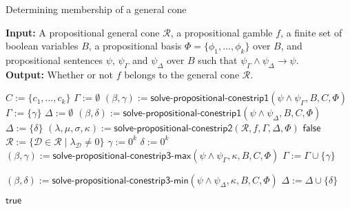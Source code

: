 \documentclass{article}
\theoremstyle{mytheorem}
\newcommand{\func}[1]{\ensuremath{\textsf{#1}}} %
\newcommand{\set}[1]{\ensuremath{\{ #1 \} }} %
\begin{document}
\begin{algorithm}[h]
\caption{Determining membership of a general cone}
{\textbf{Input:}} A propositional general cone $\mathcal{R}$, a propositional gamble $f$, a finite set of boolean variables $B$, a propositional basis $\Phi = \set{\phi_1, \ldots, \phi_k}$ over $B$, and propositional sentences $\psi$, $\psi_\Gamma$ and $\psi_\Delta$ over $B$ such that $\psi_\Gamma \land \psi_\Delta \rightarrow \psi$.
\\
{\textbf{Output:} Whether or not $f$ belongs to the general cone $\mathcal{R}$. }
\label{alg:propositional-conestrip}
\begin{algorithmic}[1]
\State $C := \set{c_1, \ldots, c_k}$ 
\State $\Gamma := \emptyset$
\State $(\beta, \gamma) := \func{solve-propositional-conestrip1}(\psi \land \psi_\Gamma, B, C, \Phi)$
\If {$\gamma \neq \bot$}
  \State $\Gamma := \set{\gamma}$
\EndIf
\State $\Delta := \emptyset$
\State $(\beta, \delta) := \func{solve-propositional-conestrip1}(\psi \land \psi_\Delta, B, C, \Phi)$
\If {$\delta \neq \bot$}
  \State $\Delta := \set{\delta}$
\EndIf
\While { \func{true} }
  \State $(\lambda, \mu, \sigma, \kappa) := \func{solve-propositional-conestrip2}(\mathcal{R}, f, \Gamma, \Delta, \Phi)$
  \If { $(\lambda, \mu, \sigma, \kappa) = (\bot,\bot,\bot,\bot)$ }
    \State \Return \func{false}
  \EndIf
  \State $\mathcal{R} := \set{\mathcal{D} \in \mathcal{R} \mid \lambda_\mathcal{D} \neq 0}$
  \State $\gamma := 0^k$
  \State $\delta := 0^k$
  \If {$\Gamma \neq \emptyset$}
    \State $(\beta, \gamma) := \func{solve-propositional-conestrip3-max}(\psi \land \psi_\Gamma, \kappa, B, C, \Phi)$
    \State $\Gamma := \Gamma \cup \set{\gamma}$
  \EndIf

  \If {$\Delta \neq \emptyset$}
    \State $(\beta, \delta) := \func{solve-propositional-conestrip3-min}(\psi \land \psi_\Delta, \kappa, B, C, \Phi)$
    \State $\Delta := \Delta \cup \set{\delta}$
  \EndIf
  
    \State \Return \func{true}
  \EndIf
\EndWhile
\EndFunction
\end{algorithmic}
\end{algorithm}
\end{document}
